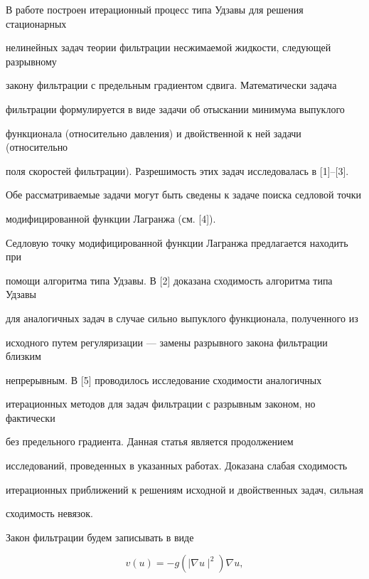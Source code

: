 \maketitle


\label{begin}





В работе построен итерационный процесс типа Удзавы для решения стационарных


нелинейных задач теории фильтрации несжимаемой жидкости, следующей разрывному


закону фильтрации с предельным градиентом сдвига. Математически задача 


фильтрации формулируется в виде задачи об отыскании минимума выпуклого 


функционала (относительно давления) и двойственной к ней задачи (относительно 


поля скоростей фильтрации). Разрешимость этих задач исследовалась в [1]--[3]. 


Обе рассматриваемые задачи могут быть сведены к задаче поиска седловой точки


модифицированной функции Лагранжа (см. [4]).


Седловую точку модифицированной функции Лагранжа предлагается находить при 


помощи алгоритма типа Удзавы. В [2] доказана сходимость алгоритма типа Удзавы


для аналогичных задач в случае сильно выпуклого функционала, полученного из 


исходного путем регуляризации --- замены разрывного закона фильтрации близким 


непрерывным. В [5] проводилось исследование сходимости аналогичных 


итерационных методов для задач фильтрации с разрывным законом, но фактически 


без предельного градиента. Данная статья является продолжением 


исследований, проведенных в указанных работах. Доказана слабая сходимость 


итерационных приближений к решениям исходной и двойственных задач, сильная 


сходимость невязок.


 


Закон фильтрации будем записывать в виде


\begin{equation}


v(u) = -g(\mid \nabla u\mid^{2})\nabla u,


\end{equation}


